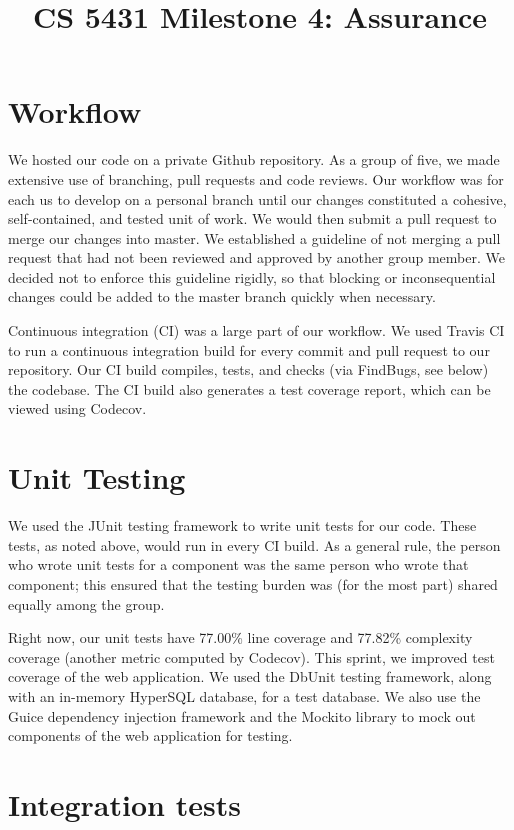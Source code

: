 \documentclass[a4paper,12pt]{article}
\title{CS 5431 Milestone 4: Assurance}
\author{
\iam{James Cassell}{jcc384}
\and
\iam{Evan King}{esk79}
\and
\iam{Ethan Koenig}{etk39}
\and
\iam{Eric Perdew}{ecp84}
\and
\iam{Will Ronchetti}{wrr33}
}
\begin{document}
\maketitle

\section{Workflow}
We hosted our code on a private Github repository. As a group of five, we made extensive use of branching, pull requests and code reviews. Our workflow was for each us to develop on a personal branch until our changes constituted a cohesive, self-contained, and tested unit of work. We would then submit a pull request to merge our changes into master. We established a guideline of not merging a pull request that had not been reviewed and approved by another group member. We decided not to enforce this guideline rigidly, so that blocking or inconsequential changes could be added to the master branch quickly when necessary.

Continuous integration (CI) was a large part of our workflow. We used Travis CI to run a continuous integration build for every commit and pull request to our repository. Our CI build compiles, tests, and checks (via FindBugs, see below) the codebase. The CI build also generates a test coverage report, which can be viewed using Codecov.

\section{Unit Testing}

We used the JUnit testing framework to write unit tests for our code. These tests, as noted above, would run in every CI build. As a general rule, the person who wrote unit tests for a component was the same person who wrote that component; this ensured that the testing burden was (for the most part) shared equally among the group.

Right now, our unit tests have 77.00\% line coverage and 77.82\% complexity coverage (another metric computed by Codecov). This sprint, we improved test coverage of the web application. We used the DbUnit testing framework, along with an in-memory HyperSQL database, for a test database. We also use the Guice dependency injection framework and the Mockito library to mock out components of the web application for testing.

\section{Integration tests}
\end{document}
